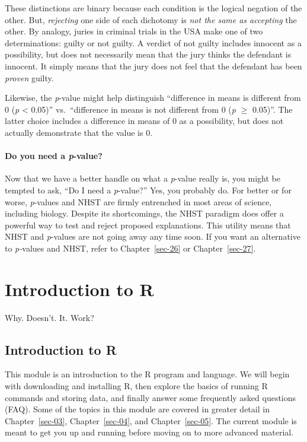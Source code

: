 \documentclass[
  13,
  letterpaper,
]{report}
\begin{document}
These distinctions are binary because each condition is the logical
negation of the other. But, \emph{rejecting} one side of each dichotomy
is \emph{not the same as accepting} the other. By analogy, juries in
criminal trials in the USA make one of two determinations: guilty or not
guilty. A verdict of not guilty includes innocent as a possibility, but
does not necessarily mean that the jury thinks the defendant is
innocent. It simply means that the jury does not feel that the defendant
has been \emph{proven} guilty.

Likewise, the \emph{p}-value might help distinguish ``difference in
means is different from 0 (\emph{p} \textless{} 0.05)'' vs.~``difference
in means is not different from 0 (\emph{p} \(\ge\) 0.05)''. The latter
choice includes a difference in means of 0 as a possibility, but does
not actually demonstrate that the value is 0.

\subsection{\texorpdfstring{Do you need a
\emph{p}-value?}{Do you need a p-value?}}\label{do-you-need-a-p-value}

Now that we have a better handle on what a \emph{p}-value really is, you
might be tempted to ask, ``Do I need a \emph{p}-value?'' Yes, you
probably do. For better or for worse, \emph{p}-values and NHST are
firmly entrenched in most areas of science, including biology. Despite
its shortcomings, the NHST paradigm does offer a powerful way to test
and reject proposed explanations. This utility means that NHST and
\emph{p}-values are not going away any time soon. If you want an
alternative to \emph{p-}values and NHST, refer to Chapter~\ref{sec-26}
or Chapter~\ref{sec-27}.

\part{Introduction to R}

Why. Doesn't. It. Work?

\chapter{Introduction to R}\label{sec-02}

This module is an introduction to the R program and language. We will
begin with downloading and installing R, then explore the basics of
running R commands and storing data, and finally answer some frequently
asked questions (FAQ). Some of the topics in this module are covered in
greater detail in Chapter~\ref{sec-03}, Chapter~\ref{sec-04}, and
Chapter~\ref{sec-05}. The current module is meant to get you up and
running before moving on to more advanced material.
\end{document}
